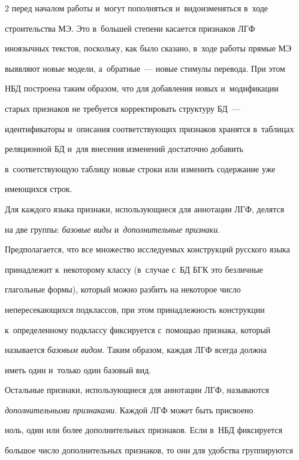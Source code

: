 \begin{multicols}{2}
перед началом работы и~могут пополняться и~видоизменяться в~ходе 

строительства МЭ. Это в~большей степени касается признаков ЛГФ 

иноязычных текстов, поскольку, как было сказано, в~ходе работы прямые МЭ 

выявляют новые модели, а~обратные~--- новые стимулы перевода. При этом 

НБД построена таким образом, что для добавления новых и~модификации 

старых признаков не требуется корректировать структуру БД~--- 

идентификаторы и~описания со\-от\-вет\-ст\-ву\-ющих признаков хранятся в~таблицах 

реляционной БД и~для внесения изменений достаточно добавить 

в~соответствующую таблицу новые строки или изменить содержание уже 

имеющихся строк.

  

  Для каждого языка признаки, использующиеся для аннотации ЛГФ, делятся 

на две группы: \textit{базовые виды} и~\textit{дополнительные признаки}. 

Предполагается, что все множество исследуемых конструкций русского языка 

принадлежит к~некоторому классу (в~случае с~БД БГК это безличные 

глагольные формы), который можно разбить на некоторое число 

непересекающихся подклассов, при этом принадлежность конструкции 

к~определенному подклассу фиксируется с~помощью признака, который 

называется \textit{базовым видом}. Таким образом, каждая ЛГФ всегда должна 

иметь один и~только один базовый вид.

{



}

  

  Остальные признаки, использующиеся для аннотации ЛГФ, называются 

\textit{дополнительными признаками}. Каждой ЛГФ может быть присвоено 

ноль, один или более дополнительных признаков. Если в~НБД фиксируется 

большое число дополнительных признаков, то они для удобства группируются 


\end{multicols}
